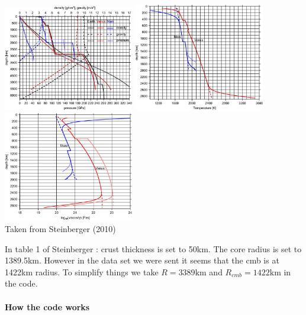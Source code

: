 \begin{center}
\includegraphics[width=5.7cm]{python_codes/fieldstone_96/images/stwt10_b}
\includegraphics[width=5.7cm]{python_codes/fieldstone_96/images/stwt10_c}
\includegraphics[width=5.7cm]{python_codes/fieldstone_96/images/stwt10_d}\\
{\captionfont Taken from Steinberger \etal (2010) \cite{stwt10}}
\end{center}

In table 1 of Steinberger \etal \cite{stwt10}: crust thickness is set to 50km. The core radius is set 
to 1389.5km. However in the data set we were sent it seems that the cmb is at 1422\si{\km}
radius.
To simplify things we take $R=3389\si{\km}$ and $R_{cmb}=1422\si{\km}$ in the code.


\paragraph{How the code works}

